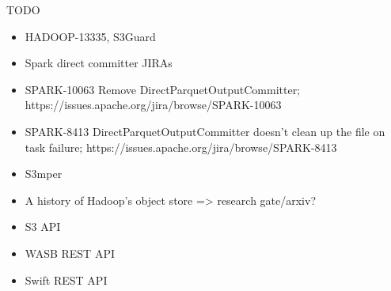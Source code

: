\documentclass[9pt,technote]{IEEEtran}
\begin{document}



TODO
\begin{itemize}
  \item HADOOP-13335, S3Guard
  \item Spark direct committer JIRAs
  \item SPARK-10063 Remove DirectParquetOutputCommitter; https://issues.apache.org/jira/browse/SPARK-10063
  \item SPARK-8413 DirectParquetOutputCommitter doesn't clean up the file on task failure; https://issues.apache.org/jira/browse/SPARK-8413
  \item S3mper
  \item A history of Hadoop's object store => research gate/arxiv?
  \item S3 API
  \item WASB REST API
  \item Swift REST API
\end{itemize}
\end{document}
